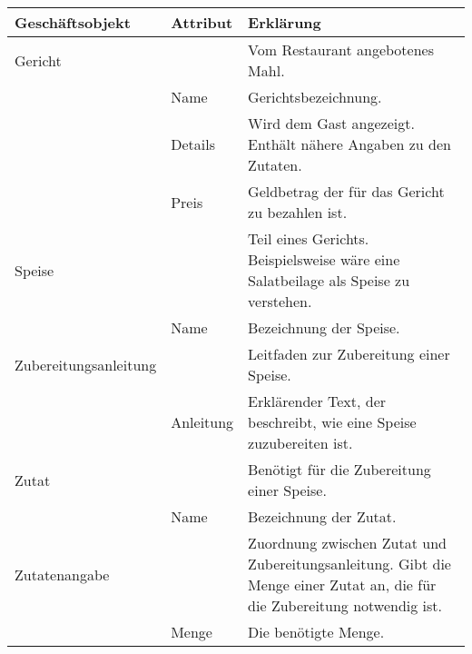 \begin{tabu} to \linewidth {X|X|X}
\hline
{}
Gesch\"aftsobjekt &Attribut &Erkl\"arung \\
\hline
Gericht & &Vom Restaurant angebotenes Mahl. \\
  \hline
  &Name &Gerichtsbezeichnung. \\
  \hline
  &Details &Wird dem Gast angezeigt. Enth\"alt n\"ahere Angaben zu den Zutaten. \\
  \hline
  &Preis &Geldbetrag der f\"ur das Gericht zu bezahlen ist. \\
\hline
Speise & &Teil eines Gerichts. Beispielsweise w\"are eine Salatbeilage als Speise zu verstehen. \\
  \hline
  &Name &Bezeichnung der Speise. \\
\hline
Zubereitungsanleitung & &Leitfaden zur Zubereitung einer Speise. \\
  \hline
  &Anleitung &Erkl\"arender Text, der beschreibt, wie eine Speise zuzubereiten ist. \\
\hline
Zutat & &Ben\"otigt f\"ur die Zubereitung einer Speise. \\
  \hline
  &Name &Bezeichnung der Zutat. \\
\hline
Zutatenangabe & &Zuordnung zwischen Zutat und Zubereitungsanleitung.
                 Gibt die Menge einer Zutat an, die f\"ur die Zubereitung notwendig ist. \\
  \hline
  &Menge &Die ben\"otigte Menge. \\
\hline
\end{tabu}
